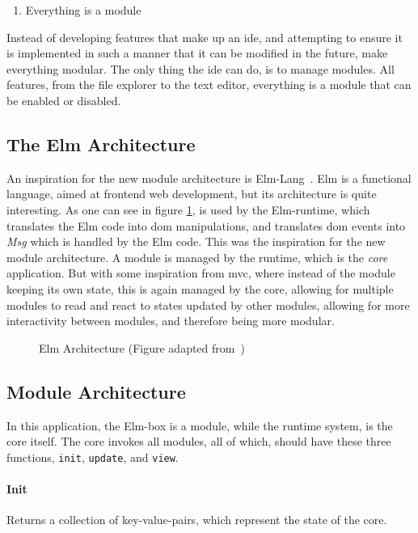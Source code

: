 \begin{enumerate}
  \item Everything is a module
\end{enumerate}

Instead of developing features that make up an \gls*{ide}, and attempting to
ensure it is implemented in such a manner that it can be modified in the future,
make everything modular. The only thing the \gls*{ide} can do, is to manage
modules. All features, from the file explorer to the text editor, everything is
a module that can be enabled or disabled.

\subsection{The Elm Architecture}

An inspiration for the new module architecture is Elm-Lang~\cite{elmLang}. Elm
is a functional language, aimed at frontend web development, but its
architecture is quite interesting. As one can see in figure
\ref{fig:elmArchitecture}, is used by the Elm-runtime, which translates the Elm
code into \gls*{dom} manipulations, and translates \gls*{dom} events into
\textit{Msg} which is handled by the Elm code. This was the inspiration for the
new module architecture. A module is managed by the runtime, which is the
\textit{core} application. But with some inspiration from \gls*{mvc}, where
instead of the module keeping its own state, this is again managed by the core,
allowing for multiple modules to read and react to states updated by other
modules, allowing for more interactivity between modules, and therefore being
more modular.

\begin{figure}
  \centering
  
  \caption{Elm Architecture (Figure adapted from~\cite{elmFig})}
  \label{fig:elmArchitecture}
\end{figure}

\subsection{Module Architecture}

In this application, the Elm-box is a module, while the runtime system, is the
core itself. The core invokes all modules, all of which, should have these three
functions, \lstinline{init}, \lstinline{update}, and \lstinline{view}.

\paragraph{Init} Returns a collection of key-value-pairs, which represent
the state of the core.

